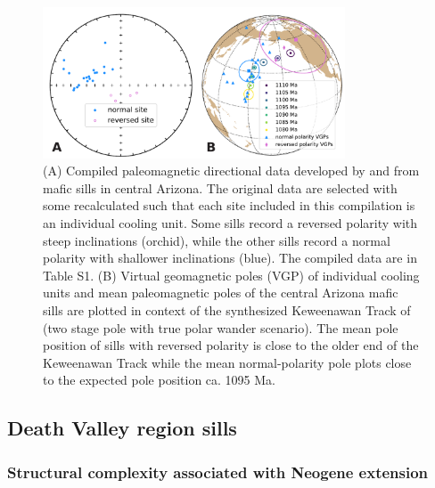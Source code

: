 \begin{figure}[h!]
\centering
\includegraphics[width=0.8\textwidth]{figure/Zhang2024b/Harlan_Donadini_compilation.pdf}
\caption[Compilation of paleomagnetic data from central Arizona mafic sills]{(A) Compiled paleomagnetic directional data developed by \cite{Harlan1993a} and \cite{Donadini2011a} from mafic sills in central Arizona. The original data are selected with some recalculated such that each site included in this compilation is an individual cooling unit. Some sills record a reversed polarity with steep inclinations (orchid), while the other sills record a normal polarity with shallower inclinations (blue). The compiled data are in Table S1. (B) Virtual geomagnetic poles (VGP) of individual cooling units and mean paleomagnetic poles of the central Arizona mafic sills are plotted in context of the synthesized Keweenawan Track of \cite{Swanson-Hysell2019a} (two stage pole with true polar wander scenario). The mean pole position of sills with reversed polarity is close to the older end of the Keweenawan Track while the mean normal-polarity pole plots close to the expected pole position ca. 1095 Ma.}
\label{fig:Harlan_Donadini_compilation}
\end{figure}

\subsection*{Death Valley region sills}
\subsubsection*{Structural complexity associated with Neogene extension}

